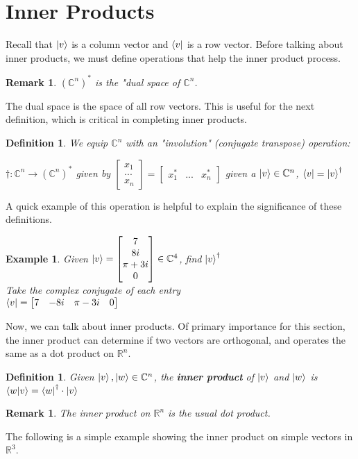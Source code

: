 \documentclass[12pt]{article}
\theoremstyle{plain}
\theoremstyle{nonumberplain}
\theoremstyle{plain}
\newtheorem{definition}[lemma]{Definition}
\newtheorem{example}[lemma]{Example}
\newtheorem{remark}[lemma]{Remark}
\theoremstyle{nonumberplain}
\newcommand\1{{\bf 1}}
\newcommand{\bmat}[1]{\begin{bmatrix*} #1 \end{bmatrix*}} %
\newcommand{\R}{\mathbb{R}} %
\newcommand{\C}{\mathbb{C}} %
\newcommand{\<}{\left\langle}
\renewcommand{\>}{\right\rangle}
\begin{document}

\section{Inner Products}

Recall that $\ket{v}$ is a column vector and $\bra{v}$ is a row vector. Before talking about inner products, we must define operations that help the inner product process.
\begin{remark}
$(\C^n)^*$ is the "dual space of $\C^n$.
\end{remark}
The dual space is the space of all row vectors. This is useful for the next definition, which is critical in completing inner products.
\begin{definition}
We equip $\C^n$ with an "involution" (\textit{conjugate transpose}) operation:
\begin{center}
$\dagger:\C^n\longrightarrow(\C^n)^*$ given by $\bmat{x_1 \\ ... \\ x_n}=\bmat{x_1^* & ... & x_n^*}$ given a $\ket{v}\in\C^n$, $\bra{v}=\ket{v}^\dagger$
\end{center}
\end{definition}
A quick example of this operation is helpful to explain the significance of these definitions.
\begin{example}
Given $\ket{v}=\bmat{7 \\ 8i \\ \pi + 3i \\ 0}\in\C^4$, find $\ket{v}^\dagger$\\
Take the complex conjugate of each entry \\
$\bra{v}=\bmat{7 & -8i & \pi-3i & 0}$
\end{example}
Now, we can talk about inner products. Of primary importance for this section, the inner product can determine if two vectors are orthogonal, and operates the same as a dot product on $\R^n$.
\begin{definition}
Given $\ket{v}, \ket{w}\in\C^n$, the \textbf{inner product} of $\ket{v}$ and $\ket{w}$ is $\langle w|v \rangle=\bra{w}^\dagger\cdot\ket{v}$
\end{definition}
\begin{remark}
The inner product on $\R^n$ is the usual dot product.
\end{remark}
The following is a simple example showing the inner product on simple vectors in $\R^3$.
\end{document}
